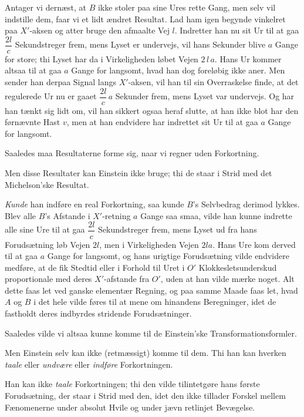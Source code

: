 \documentclass[12pt,a4paper]{article}
\newcommand{\opage}[1]{\marginnote{\footnotesize\textit{[#1]}}}
\begin{document}
Antager vi dernæst, at $B$ ikke stoler paa sine Ures rette Gang, men selv vil
indstille dem, faar vi et lidt ændret Resultat. Lad ham igen begynde vinkelret
paa $X'$-aksen og atter bruge den afmaalte Vej $l$. Indretter han nu sit Ur til
at gaa $\dfrac{2l}{c}$ Sekundstreger frem, mens Lyset er undervejs, vil hans
Sekunder blive $a$ Gange for store; thi Lyset har da i Virkeligheden løbet
Vejen $2\,l\,a$. Hans Ur kommer altsaa til at gaa $a$ Gange for langsomt, hvad
han dog foreløbig ikke aner. Men sender han derpaa Signal langs $X'$-aksen, vil
han til sin Overraskelse finde, at det regulerede Ur nu er gaaet
$\dfrac{2l}{c}\,a$ \guillemotleft Sekunder\guillemotright{} frem, mens Lyset
var undervejs. Og har han tænkt sig lidt om, vil han sikkert ogsaa heraf
slutte, at han ikke blot har den førnævnte Hast $v$, men at han endvidere har
indrettet sit Ur til at gaa $a$ Gange for langsomt.

Saaledes maa Resultaterne forme sig, naar vi regner uden Forkortning.

\opage{201} Men disse Resultater kan Einstein ikke bruge; thi de staar i Strid med det
Michelson'ske Resultat.

\emph{Kunde} han indføre en real Forkortning, saa kunde $B$'s Selvbedrag
derimod lykkes. Blev alle $B$'s Afstande i $X'$-retning $a$ Gange saa smaa,
vilde han kunne indrette alle sine Ure til at gaa $\dfrac{2l}{c}$
Sekundstreger frem, mens Lyset ud fra hans Forudsætning løb Vejen $2l$, men i
Virkeligheden Vejen $2la$. Hans Ure kom derved til at gaa $a$ Gange for
langsomt, og hans urigtige Forudsætning vilde endvidere medføre, at de fik
Stedtid eller i Forhold til Uret i $O'$ Klokkesletsunderskud proportionale med
deres $X'$-afstande fra $O'$, uden at han vilde mærke noget. Alt dette faas let
ved ganske elementær Regning, og paa samme Maade faas let, hvad $A$ og $B$ i
det hele vilde føres til at mene om hinandens Beregninger, idet de fastholdt
deres indbyrdes stridende Forudsætninger.

Saaledes vilde vi altsaa kunne komme til \guillemotleft de Einstein'ske
Transformationsformler\guillemotright.

Men Einstein selv kan ikke (retmæssigt) komme til dem. Thi han kan hverken
\emph{taale} eller \emph{undvære} eller \emph{indføre} Forkortningen.

Han kan ikke \emph{taale} Forkortningen; thi den vilde tilintetgøre hans
første Forudsætning, der staar i Strid med den, idet den ikke tillader Forskel
mellem Fænomenerne under absolut Hvile og under jævn retlinjet Bevægelse.
\end{document}
